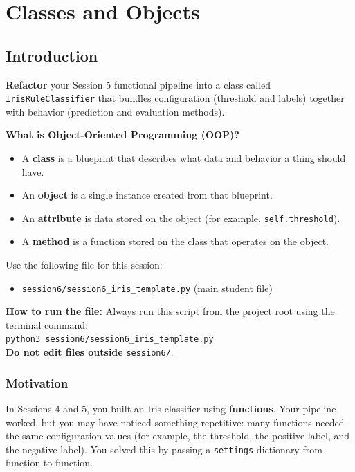 \chapter{Classes and Objects}

\section{Introduction}

\begin{tcolorbox}[title=Goal]
\textbf{Refactor} your Session 5 functional pipeline into a class called \texttt{IrisRuleClassifier} that bundles configuration (threshold and labels) together with behavior (prediction and evaluation methods).

\medskip
\textbf{What is Object-Oriented Programming (OOP)?}
\begin{itemize}\setlength{\itemsep}{2pt}
    \item A \textbf{class} is a blueprint that describes what data and behavior a thing should have.
    \item An \textbf{object} is a single instance created from that blueprint.
    \item An \textbf{attribute} is data stored on the object (for example, \texttt{self.threshold}).
    \item A \textbf{method} is a function stored on the class that operates on the object.
\end{itemize}
\end{tcolorbox}

\begin{tcolorbox}[title=You will work in]
Use the following file for this session:
\begin{itemize}
    \item \texttt{session6/session6\_iris\_template.py} (main student file)
\end{itemize}
\textbf{How to run the file:} Always run this script from the project root using the terminal command: \\
\texttt{python3 session6/session6\_iris\_template.py} \\
\textbf{Do not edit files outside} \texttt{session6/}.
\end{tcolorbox}

\subsection{Motivation}
In Sessions 4 and 5, you built an Iris classifier using \textbf{functions}.
Your pipeline worked, but you may have noticed something repetitive: many functions needed the same configuration values (for example, the threshold, the positive label, and the negative label).
You solved this by passing a \texttt{settings} dictionary from function to function.

